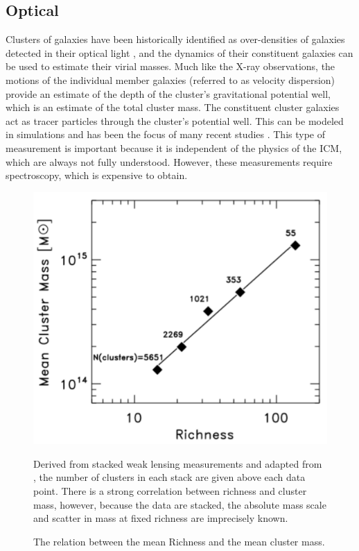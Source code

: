 \subsection{Optical}
Clusters of galaxies have been historically identified as over-densities of galaxies detected in their optical light , and the dynamics of their constituent galaxies can be used to estimate their virial masses. Much like the X-ray observations, the motions of the individual member galaxies (referred to as velocity dispersion) provide an estimate of the depth of the cluster's gravitational potential well, which is an estimate of the total cluster mass. The constituent cluster galaxies act as tracer particles through the cluster's potential well. This can be modeled in simulations and has been the focus of many recent studies . This type of measurement is important because it is independent of the physics of the ICM, which are always not fully understood. However, these measurements require spectroscopy, which is expensive to obtain.

\begin{figure}[!ht]
	\begin{center}
		\includegraphics[height=0.5\textheight]{figures/massrichness.pdf}
	\end{center}
	\caption{The relation between the mean Richness and the mean cluster mass.} 
	Derived from stacked weak lensing measurements and adapted from \citealt{Rozo2010}, the number of clusters in each stack are given above each data point. There is a strong correlation between richness and cluster mass, however, because the data are stacked, the absolute mass scale and scatter in mass at fixed richness are imprecisely known.
	\label{fig:massrichness}
\end{figure}

